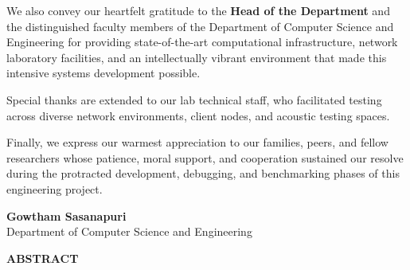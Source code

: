 \documentclass[12pt,oneside,letterpaper]{report}
\numberwithin{equation}{chapter} %
\begin{document}
We also convey our heartfelt gratitude to the \textbf{Head of the Department} and the distinguished faculty members of the Department of Computer Science and Engineering for providing state-of-the-art computational infrastructure, network laboratory facilities, and an intellectually vibrant environment that made this intensive systems development possible.

Special thanks are extended to our lab technical staff, who facilitated testing across diverse network environments, client nodes, and acoustic testing spaces.

Finally, we express our warmest appreciation to our families, peers, and fellow researchers whose patience, moral support, and cooperation sustained our resolve during the protracted development, debugging, and benchmarking phases of this engineering project.

\vspace{2.0cm}
\noindent \textbf{Gowtham Sasanapuri} \\
Department of Computer Science and Engineering

\newpage
\begin{center}
{\fontsize{14pt}{18pt}\selectfont \textbf{ABSTRACT}}\\[1.0cm]
\end{center}
\end{document}
